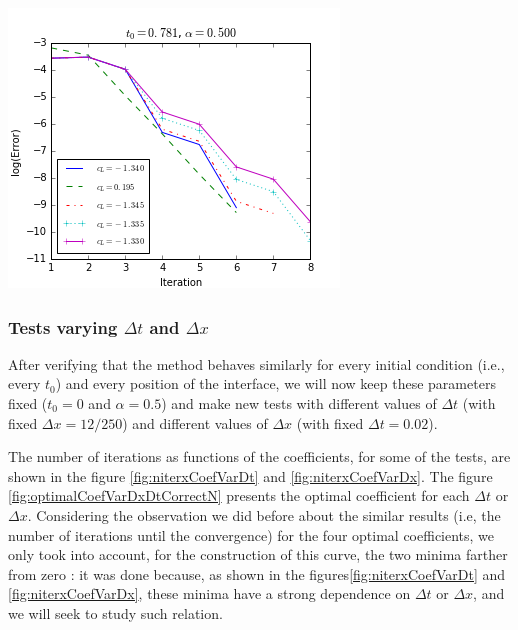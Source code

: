 \begingroup
\begin{center}
\includegraphics[scale=.5]{figures/FinalFigures/errorEvolutionFixedT0BFinalVersion.png}
\end{center}
\endgroup

\subsubsection{Tests varying $\Delta t$ and $\Delta x$}

\indent After verifying that the method behaves similarly for every initial condition (i.e., every $t_0$) and every position of the interface, we will now keep these parameters fixed ($t_0 = 0$ and $\alpha = 0.5$) and make new tests with different values of $\Delta t$ (with fixed $\Delta x = 12/250$) and different values of $\Delta x$ (with fixed $\Delta t = 0.02$).

\indent The number of iterations as functions of the coefficients, for some of the tests, are shown in the figure \ref{fig:niterxCoefVarDt} and \ref{fig:niterxCoefVarDx}. The figure \ref{fig:optimalCoefVarDxDtCorrectN} presents the optimal coefficient for each $\Delta t$ or $\Delta x$. Considering the observation we did before about the similar results (i.e, the number of iterations until the convergence) for the four optimal coefficients, we only took into account, for the construction of this curve, the two minima farther from zero : it was done because, as shown  in the figures\ref{fig:niterxCoefVarDt} and \ref{fig:niterxCoefVarDx}, these minima have a strong dependence on $\Delta t$ or $\Delta x$, and we will seek to study such relation.

